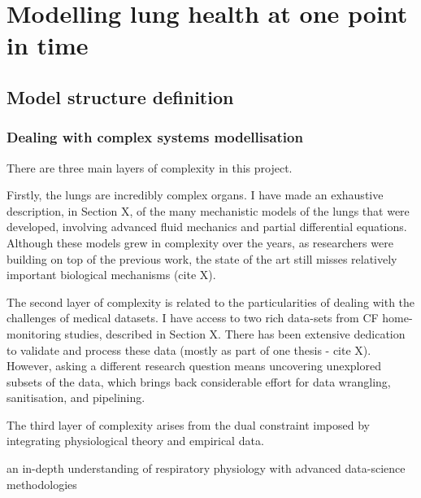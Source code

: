 
\chapter{Modelling lung health at one point in time}  %

\ifpdf
    \graphicspath{{Chapter1/Figs/Raster/}{Chapter1/Figs/PDF/}{Chapter1/Figs/}}
\else
    \graphicspath{{Chapter1/Figs/Vector/}{Chapter1/Figs/}}
\fi

\section{Model structure definition}

\subsection{Dealing with complex systems modellisation}

There are three main layers of complexity in this project.

Firstly, the lungs are incredibly complex organs. I have made an exhaustive description, in Section X, of the many mechanistic models of the lungs that were developed, involving advanced fluid mechanics and partial differential equations. Although these models grew in complexity over the years, as researchers were building on top of the previous work, the state of the art still misses relatively important biological mechanisms (cite X).

The second layer of complexity is related to the particularities of dealing with the challenges of medical datasets. I have access to two rich data-sets from CF home-monitoring studies, described in Section X. There has been extensive dedication to validate and process these data (mostly as part of one thesis - cite X). However, asking a different research question means uncovering unexplored subsets of the data, which brings back considerable effort for data wrangling, sanitisation, and pipelining.

The third layer of complexity arises from the dual constraint imposed by integrating physiological theory and empirical data. 

an in-depth understanding of respiratory physiology with advanced data-science methodologies

